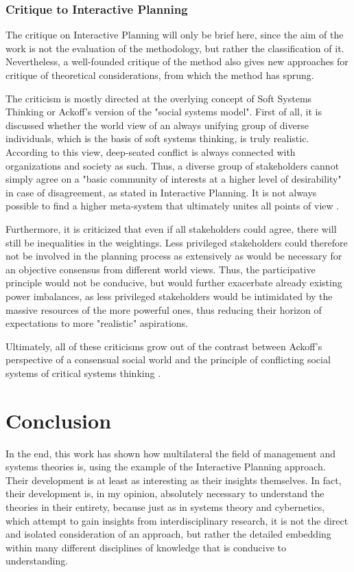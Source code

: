 \documentclass[a4paper,12pt]{article}
\begin{document}
\subsubsection{Critique to Interactive Planning}	

The critique on Interactive Planning will only be brief here, since the aim of
the work is not the evaluation of the methodology, but rather the
classification of it. Nevertheless, a well-founded critique of the method also
gives new approaches for critique of theoretical considerations, from which
the method has sprung.

The criticism is mostly directed at the overlying concept of Soft Systems
Thinking or Ackoff's version of the "social systems model". First of all, it
is discussed whether the world view of an always unifying group of diverse
individuals, which is the basis of soft systems thinking, is truly
realistic. According to this view, deep-seated conflict is always connected
with organizations and society as such. Thus, a diverse group of stakeholders
cannot simply agree on a "basic community of interests at a higher level of
desirability" \cite{ackoff:1975} in case of disagreement, as stated in
Interactive Planning. It is not always possible to find a higher meta-system
that ultimately unites all points of view \cite{jackson:1991}.

Furthermore, it is criticized that even if all stakeholders could agree, there
will still be inequalities in the weightings. Less privileged stakeholders
could therefore not be involved in the planning process as extensively as
would be necessary for an objective consensus from different world
views. Thus, the participative principle would not be conducive, but would
further exacerbate already existing power imbalances, as less privileged
stakeholders would be intimidated by the massive resources of the more
powerful ones, thus reducing their horizon of expectations to more "realistic"
aspirations.

Ultimately, all of these criticisms grow out of the contrast between Ackoff's
perspective of a consensual social world and the principle of conflicting
social systems of critical systems thinking \cite{jackson:2003}.

\section{Conclusion}
In the end, this work has shown how multilateral the field of management and
systems theories is, using the example of the Interactive Planning approach.
Their development is at least as interesting as their insights themselves. In
fact, their development is, in my opinion, absolutely necessary to understand
the theories in their entirety, because just as in systems theory and
cybernetics, which attempt to gain insights from interdisciplinary research,
it is not the direct and isolated consideration of an approach, but rather the
detailed embedding within many different disciplines of knowledge that is
conducive to understanding.
\end{document}
